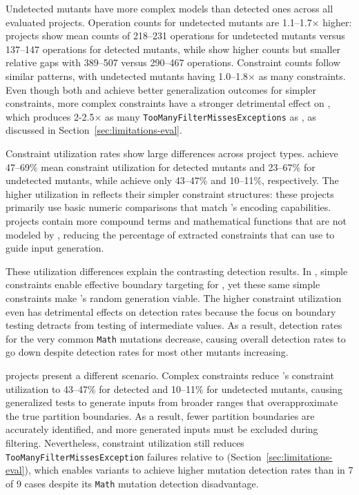 Undetected mutants have more complex models than detected ones
across all evaluated projects.
Operation counts for undetected mutants are 1.1--1.7$\times$ higher:
\DatasetsEqBenchEs{} projects show mean counts of
218--231 operations for undetected mutants
versus 137--147 operations for detected mutants,
while \DatasetsCommonsEs{} show higher counts but smaller relative gaps with 389--507 versus 290--467 operations.
Constraint counts follow similar patterns,
with undetected mutants having 1.0--1.8$\times$ as many constraints.
Even though both \VariantNaive{} and \VariantImproved{}
achieve better generalization outcomes for simpler constraints,
more complex constraints have a stronger detrimental effect on \VariantNaive{},
which produces 2-2.5$\times$ as many \texttt{Too\-Many\-Filter\-Misses\-Exceptions} as \VariantImproved{},
as discussed in Section~\ref{sec:limitations-eval}.

Constraint utilization rates show large differences across project types.
\DatasetsEqBenchEs{} achieve 47--69\% mean constraint utilization for detected mutants
and 23--67\% for undetected mutants,
while \DatasetsCommonsEs{} achieve only 43--47\% and 10--11\%, respectively.
The higher utilization in \DatasetsEqBenchEs{} reflects their simpler constraint structures:
these projects primarily use basic numeric comparisons
that match \VariantImproved{}'s encoding capabilities.
\DatasetsCommonsEs{} projects contain more compound terms
and mathematical functions that are not modeled by \ToolTeralizer{},
reducing the percentage of extracted constraints that \VariantImproved{} can use to guide input generation.

These utilization differences explain the contrasting detection results.
In \DatasetsEqBenchEs{}, simple constraints enable effective boundary targeting for \VariantImproved{},
yet these same simple constraints make \VariantNaive{}'s random generation viable.
The higher constraint utilization even has detrimental effects
on \VariantImproved{} detection rates
because the focus on boundary testing detracts from testing of intermediate values.
As a result, detection rates for the very common \texttt{Math} mutations decrease,
causing overall detection rates to go down despite detection rates for most other mutants increasing.

\DatasetsCommonsEs{} projects present a different scenario.
Complex constraints reduce \VariantImproved{}'s constraint utilization to 43--47\% for detected
and 10--11\% for undetected mutants,
causing generalized tests to generate inputs from broader ranges
that overapproximate the true partition boundaries.
As a result, fewer partition boundaries are accurately identified,
and more generated inputs must be excluded during filtering.
Nevertheless, constraint utilization still reduces \texttt{Too\-Many\-Filter\-Misses\-Exception} failures
relative to \VariantNaive{} (Section~\ref{sec:limitations-eval}), which
enables \VariantImproved{} variants to achieve higher mutation detection rates
than \VariantNaive{} in 7 of 9 cases
despite its \texttt{Math} mutation detection disadvantage.

